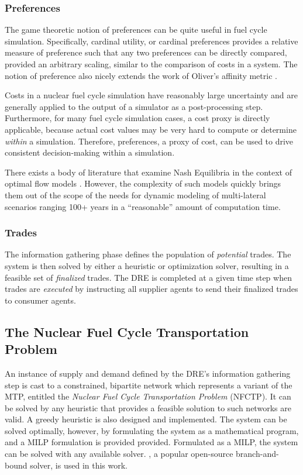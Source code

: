\subsubsection{Preferences}

The game theoretic notion of preferences can be quite useful in fuel cycle
simulation. Specifically, cardinal utility, or cardinal preferences
\cite{strotz_cardinal_1953} provides a relative measure of preference such that
any two preferences can be directly compared, provided an arbitrary scaling,
similar to the comparison of costs in a system. The notion of preference also
nicely extends the work of Oliver's affinity metric
\cite{oliver_geniusv2:_2009}.


Costs in a nuclear fuel cycle simulation have reasonably large uncertainty
\cite{shropshire_advanced_2009} and are generally applied to the output of a
simulator as a post-processing step. Furthermore, for many fuel cycle simulation
cases, a cost proxy is directly applicable, because actual cost values may be
very hard to compute or determine \textit{within} a simulation. Therefore,
preferences, a proxy of cost, can be used to drive consistent decision-making
within a simulation.

There exists a body of literature that examine Nash Equilibria in the context of
optimal flow models
\cite{mazumdar_fairness_1991,nagurney_supply_2002,song_nash_2002}. However, the
complexity of such models quickly brings them out of the scope of the needs for
dynamic modeling of multi-lateral scenarios ranging 100+ years in a
``reasonable'' amount of computation time.

\subsubsection{Trades}

The information gathering phase defines the population of \textit{potential}
trades. The system is then solved by either a heuristic or optimization solver,
resulting in a feasible set of \textit{finalized} trades. The DRE is completed
at a given time step when trades are \textit{executed} by instructing all
supplier agents to send their finalized trades to consumer agents.

\subsection{The Nuclear Fuel Cycle Transportation Problem}\label{abm:dre:fctp}

An instance of supply and demand defined by the DRE's information gathering step
is cast to a constrained, bipartite network which represents a variant of the
MTP, entitled the \textit{Nuclear Fuel Cycle Transportation Problem} (NFCTP). It
can be solved by any heuristic that provides a feasible solution to such
networks are valid.  A greedy heuristic is also designed and implemented. The
system can be solved optimally, however, by formulating the system as a
mathematical program, and a MILP formulation is provided provided. Formulated as
a MILP, the system can be solved with any available
solver. \cbc\cite{forrestcbc}, a popular open-source branch-and-bound solver, is
used in this work.

